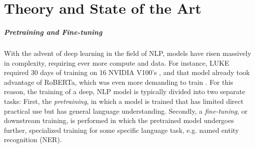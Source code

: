\documentclass[main.tex]{subfiles}
\begin{document}
\chapter{Theory and State of the Art}
\label{chap:theory}
\paragraph{Pretraining and Fine-tuning}
With the advent of deep learning in the field of NLP, models have risen massively in complexity, requiring ever more compute and data.
For instance, LUKE required 30 days of training on 16 NVIDIA V100's \cite{yamada2020luke}, and that model already took advantage of RoBERTa, which was even more demanding to train \cite{liu2019roberta}.
For this reason, the training of a deep, NLP model is typically divided into two separate tasks:
First, the \emph{pretraining}, in which a model is trained that has limited direct practical use but has general language understanding.
Secondly, a \emph{fine-tuning}, or downstream training, is performed in which the pretrained model undergoes further, specialized training for some specific language task, e.g. named entity recognition (NER).
\end{document}
